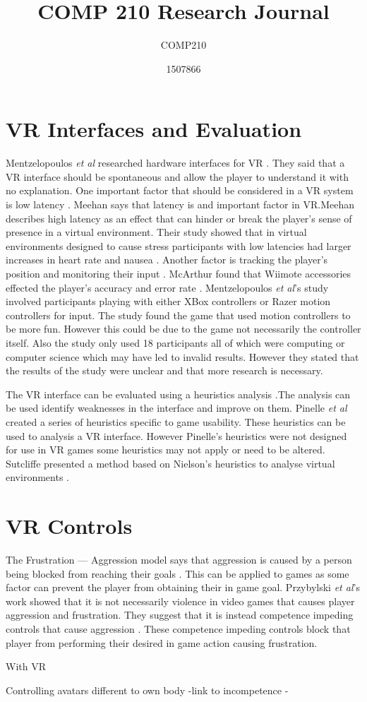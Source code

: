 \documentclass{scrartcl}
\title{COMP 210 Research Journal}
\subtitle{COMP210}
\author{1507866}
\begin{document}
	
\maketitle
	
\abstract{}
	
\section{VR Interfaces and Evaluation}
Mentzelopoulos \textit{et al} researched hardware interfaces for VR \cite{Mentzelopoulos}. They said that a VR interface should be spontaneous and allow the player to understand it with no explanation.
One important factor that should be considered in a VR system is low latency \cite{Mentzelopoulos, Meehan}. 
 Meehan says that latency is and important factor in VR.Meehan describes high latency as an effect that can hinder or break the player's sense of presence in a virtual environment. Their study showed that in virtual environments designed to cause stress participants with low latencies had larger increases in heart rate and nausea \cite{Meehan}.
Another factor is tracking the player's position and monitoring their input \cite{Mentzelopoulos}. McArthur found that Wiimote accessories effected the player's accuracy and error rate \cite{McArthur}.
Mentzelopoulos \textit{et al}'s study involved participants playing with either XBox controllers or Razer motion controllers for input. The study found the game that used motion controllers to be more fun. However this could be due to the game not necessarily the controller itself. Also the study only used 18 participants all of which were computing or computer science which may have led to invalid results. However they stated that the results of the study were unclear and that more research is necessary. 


The VR interface can be evaluated using a heuristics analysis \cite{Nielsen, Pinelle}.The analysis can be used identify weaknesses in the interface and improve on them. Pinelle \textit{et al} created a series of heuristics specific to game usability. These heuristics can be used to analysis a VR interface. However Pinelle's heuristics were not designed for use in VR games some heuristics may not apply or need to be altered.  Sutcliffe presented a method based on Nielson's heuristics to analyse virtual environments \cite{sutcliffe2004heuristic}.


\cite{stanney}

\section{VR Controls}
The Frustration --- Aggression model says that aggression is caused by a person being blocked from reaching their goals \cite{dollard1939frustration}.  This can be applied to games as some factor can prevent the player from obtaining their in game goal.  Przybylski \textit{et al}'s work showed that it is not necessarily violence in video games that causes player aggression and frustration. They suggest that it is instead competence impeding controls that cause aggression \cite{przybylski, przybylski2010motivational}. These competence impeding controls block that player from performing their desired in game action causing frustration. 

With VR 


Controlling avatars different to own body 
-link to incompetence 
-
\cite{won2015homuncular}

	


	
\end{document}
